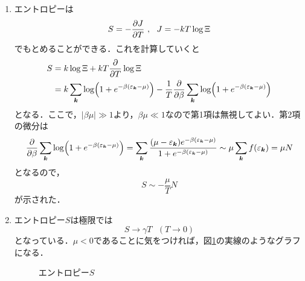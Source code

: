 \documentclass[a4paper,pdflatex,ja=standard]{bxjsarticle}
\begin{document}
\begin{enumerate}
  \item 
  エントロピーは
  \begin{equation}
    S
    =
    -\pdv{J}{T}
    \ ,\ \ 
    J=-kT\log\Xi
    \label{def_entropy}
  \end{equation}
  でもとめることができる．これを計算していくと
  \begin{align}
    S
    &=
    k\log\Xi
    +
    kT\pdv{}{T} \log\Xi
    \nonumber
    \\
    &=
    k\sum_{\bm{k}}\log(1+e^{-\beta(\varepsilon_{\bm{k}}-\mu)})
    -
    \frac{1}{T}\pdv{}{\beta}\sum_{\bm{k}}\log(1+e^{-\beta(\varepsilon_{\bm{k}}-\mu)})
  \end{align}
  となる．ここで，$|\beta\mu|\gg 1$より，$\beta\mu\ll 1$なので第1項は無視してよい．第2項の微分は
  \begin{equation}
    \pdv{}{\beta}\sum_{\bm{k}}\log(1+e^{-\beta(\varepsilon_{\bm{k}}-\mu)})
    =
    \sum_{\bm{k}}\frac{(\mu-\varepsilon_{\bm{k}})e^{-\beta(\varepsilon_{\bm{k}}-\mu)}}{1+e^{-\beta(\varepsilon_{\bm{k}}-\mu)}}
    \sim
    \mu\sum_{\bm{k}}f(\varepsilon_{\bm{k}})
    =
    \mu N
  \end{equation}
  となるので，
  \begin{equation}
    S
    \sim
    -\frac{\mu}{T}N
  \end{equation}
  が示された．
  
  \clearpage
  \item 
  エントロピー$S$は極限では
  \begin{equation}
    S
    \rightarrow
    \gamma T
    \ \ \ (T\rightarrow0)
  \end{equation}
  となっている．$\mu<0$であることに気をつければ，図\ref{fig1}の実線のようなグラフになる．
  \begin{figure}[ht]
  \centering
  \caption{エントロピー$S$}
  \label{fig1}
  \end{figure}
  
\end{enumerate}
\end{document}
